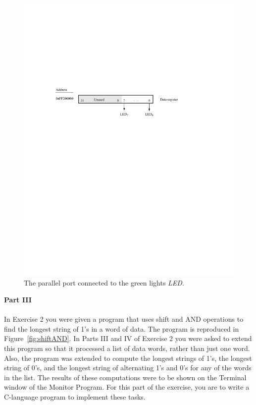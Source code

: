 \documentclass[epsfig,10pt,fullpage]{article}
\begin{document}
\begin{figure}[htb]
	\begin{center}
	\includegraphics[scale=1]{figures/figureLED.pdf}
	\end{center}
	\caption{The parallel port connected to the green lights {\it LED}.}
\label{fig:LED}
\end{figure}

\noindent
{\bf Part III}
~\\
~\\
\noindent
In Exercise 2 you were given a program that uses shift and AND operations to find the
longest string of 1's in a word of data. The program is reproduced in
Figure~\ref{fig:shiftAND}.  In Parts III and IV of Exercise 2 you were asked to extend
this program so that it processed a list of data words, rather than just one word. Also,
the program was extended to compute the longest
strings of 1's, the longest string of 0's, and the longest string of alternating 1's and 0's
for any of the words in the list. The results of these computations were to be shown 
on the Terminal window of the Monitor Program. For this part of the exercise, you are 
to write a C-language program to implement these tasks.
\end{document}
